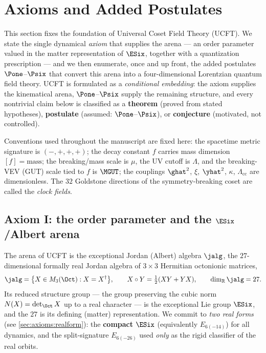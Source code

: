 \section{Axioms and Added Postulates}
\label{sec:axioms:main}

This section fixes the foundation of Universal Coset Field Theory (UCFT).
We state the single dynamical \emph{axiom} that supplies the arena --- an
order parameter valued in the matter representation of $\ESix$, together
with a quantization prescription --- and we then enumerate, once and up
front, the added postulates $\Pone$--$\Psix$ that convert this arena into a
four-dimensional Lorentzian quantum field theory. UCFT is formulated as a
\emph{conditional embedding}: the axiom supplies the kinematical arena,
$\Pone$--$\Psix$ supply the remaining structure, and every nontrivial claim
below is classified as a \textbf{theorem} (proved from stated hypotheses),
\textbf{postulate} (assumed: $\Pone$--$\Psix$), or
\textbf{conjecture} (motivated, not controlled).

Conventions used throughout the manuscript are fixed here: the spacetime
metric signature is $(-,+,+,+)$; the decay constant $f$ carries mass
dimension $[f]=\text{mass}$; the breaking/mass scale is $\mu$, the UV cutoff
is $\Lambda$, and the breaking-VEV (GUT) scale tied to $f$ is $\MGUT$; the
couplings $\ghat^2$, $\xi$, $\yhat^2$, $\kappa$, $\Lambda_{\mathrm{cc}}$ are
dimensionless. The $32$ Goldstone directions of the symmetry-breaking coset
are called the \emph{clock fields}.

\subsection{Axiom I: the order parameter and the \texorpdfstring{$\ESix$}{E6}/Albert arena}
\label{sec:axioms:axiomI}

The arena of UCFT is the exceptional Jordan (Albert) algebra
$\jalg$, the $27$-dimensional formally real Jordan algebra of
$3\times3$ Hermitian octonionic matrices,
\[
  \jalg=\bigl\{X\in M_3(\Oct): X=X^{\dagger}\bigr\},
  \qquad X\circ Y=\tfrac12(XY+YX),
  \qquad \dim_{\mathbb R}\jalg=27 .
\]
Its reduced structure group --- the group preserving the cubic norm
$N(X)=\det_{\Oct}X$ up to a real character --- is the exceptional Lie group
$\ESix$, and the $27$ is its defining (matter) representation. We commit to
\emph{two real forms} (see \autoref{sec:axioms:realform}): the
\textbf{compact} $\ESix$ (equivalently $E_{6(-14)}$) for all dynamics, and
the split-signature $E_{6(-26)}$ used \emph{only} as the rigid classifier of
the real orbits.

